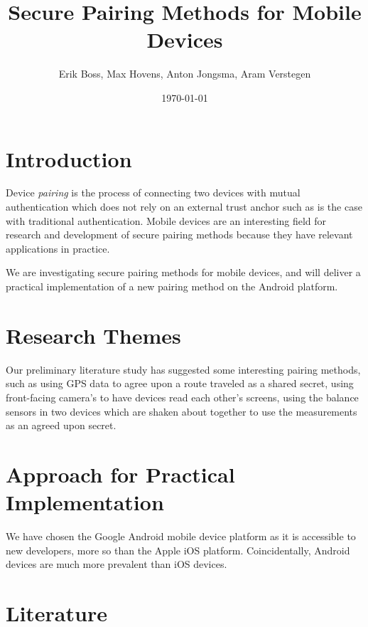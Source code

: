 \documentclass{article}
\title{Secure Pairing Methods for Mobile Devices}
\date{\today}
\author{Erik Boss, Max Hovens, Anton Jongsma, Aram Verstegen}
\begin{document}
\begin{abstract}
\end{abstract}

\section{Introduction}
Device \textit{pairing} is the process of connecting two devices with mutual authentication which does not rely on an external trust anchor such as is the case with traditional authentication.
Mobile devices are an interesting field for research and development of secure pairing methods because they have relevant applications in practice.

We are investigating secure pairing methods for mobile devices, and will deliver a practical implementation of a new pairing method on the Android platform.

\section{Research Themes}
Our preliminary literature study has suggested some interesting pairing methods, such as using GPS data to agree upon a route traveled as a shared secret, %
using front-facing camera's to have devices read each other's screens, %
using the balance sensors in two devices which are shaken about together to use the measurements as an agreed upon secret.

\section{Approach for Practical Implementation}
We have chosen the Google Android mobile device platform as it is accessible to new developers, more so than the Apple iOS platform.
Coincidentally, Android devices are much more prevalent than iOS devices.

\section{Literature}
\end{document}
